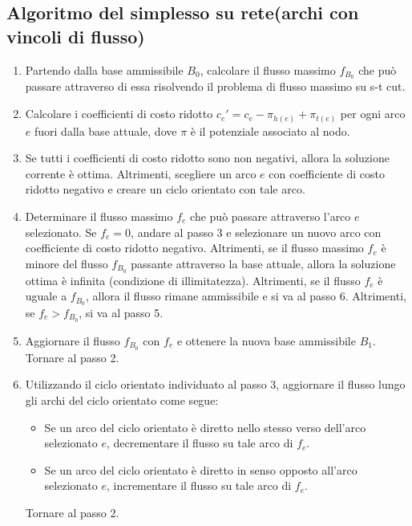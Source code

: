 \subsection{Algoritmo del simplesso su rete(archi con vincoli di flusso)}
\begin{enumerate}
\item Partendo dalla base ammissibile $B_0$, calcolare il flusso massimo $f_{B_0}$ che può passare attraverso di essa risolvendo il problema di flusso massimo su s-t cut.

\item Calcolare i coefficienti di costo ridotto $c_e' = c_e - \pi_{h(e)} + \pi_{t(e)}$ per ogni arco $e$ fuori dalla base attuale, dove $\pi$ è il potenziale associato al nodo.

\item Se tutti i coefficienti di costo ridotto sono non negativi, allora la soluzione corrente è ottima. Altrimenti, scegliere un arco $e$ con coefficiente di costo ridotto negativo e creare un ciclo orientato con tale arco.

\item Determinare il flusso massimo $f_e$ che può passare attraverso l'arco $e$ selezionato. Se $f_e = 0$, andare al passo 3 e selezionare un nuovo arco con coefficiente di costo ridotto negativo. Altrimenti, se il flusso massimo $f_e$ è minore del flusso $f_{B_0}$ passante attraverso la base attuale, allora la soluzione ottima è infinita (condizione di illimitatezza). Altrimenti, se il flusso $f_e$ è uguale a $f_{B_0}$, allora il flusso rimane ammissibile e si va al passo 6. Altrimenti, se $f_e > f_{B_0}$, si va al passo 5.

\item Aggiornare il flusso $f_{B_0}$ con $f_e$ e ottenere la nuova base ammissibile $B_1$. Tornare al passo 2.

\item Utilizzando il ciclo orientato individuato al passo 3, aggiornare il flusso lungo gli archi del ciclo orientato come segue:
\begin{itemize}
\item Se un arco del ciclo orientato è diretto nello stesso verso dell'arco selezionato $e$, decrementare il flusso su tale arco di $f_e$.
\item Se un arco del ciclo orientato è diretto in senso opposto all'arco selezionato $e$, incrementare il flusso su tale arco di $f_e$.
\end{itemize}
Tornare al passo 2.
\end{enumerate}

